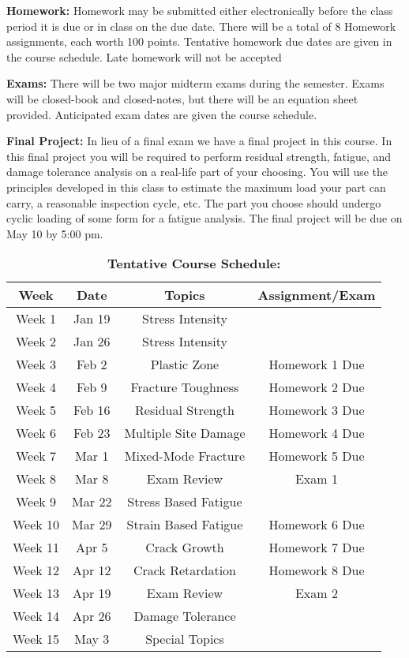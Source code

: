 \documentclass[11pt, a4paper]{article}
\begin{document}
\vspace*{.15in}
\noindent\textbf{Homework:} 
Homework may be submitted either electronically before the class period it is due or in class on the due date.
There will be a total of 8 Homework assignments, each worth 100 points.
Tentative homework due dates are given in the course schedule.
Late homework will not be accepted

\vspace*{.15in}
\noindent\textbf{Exams:} 
There will be two major midterm exams during the semester.
Exams will be closed-book and closed-notes, but there will be an equation sheet provided.
Anticipated exam dates are given the course schedule.

\vspace*{.15in}
\noindent\textbf{Final Project:} 
In lieu of a final exam we have a final project in this course.
In this final project you will be required to perform residual strength, fatigue, and damage tolerance analysis on a real-life part of your choosing.
You will use the principles developed in this class to estimate the maximum load your part can carry, a reasonable inspection cycle, etc.
The part you choose should undergo cyclic loading of some form for a fatigue analysis.
The final project will be due on May 10 by 5:00 pm.

\vspace*{.15in}
\begin{table}
	\captionsetup{singlelinecheck=false,justification=raggedright}
	\caption*{\noindent \textbf{Tentative Course Schedule:}}
	\centering
		\begin{tabular}{cccc}
			\hline
			Week & Date & Topics & Assignment/Exam \\
			\hline
			Week 1 & Jan 19 & Stress Intensity &  \\
			Week 2 & Jan 26 & Stress Intensity & \\
			Week 3 & Feb 2 & Plastic Zone & Homework 1 Due\\
			Week 4 & Feb 9 & Fracture Toughness & Homework 2 Due\\
			Week 5 & Feb 16 & Residual Strength & Homework 3 Due\\
			Week 6 & Feb 23 & Multiple Site Damage & Homework 4 Due\\
			Week 7 & Mar 1 & Mixed-Mode Fracture & Homework 5 Due\\
			Week 8 & Mar 8 & Exam Review & Exam 1 \\
			Week 9 & Mar 22 & Stress Based Fatigue & \\
			Week 10 & Mar 29 & Strain Based Fatigue & Homework 6 Due\\
			Week 11 & Apr 5 & Crack Growth & Homework 7 Due\\
			Week 12 & Apr 12 & Crack Retardation & Homework 8 Due\\
			Week 13 & Apr 19 & Exam Review & Exam 2\\
			Week 14 & Apr 26 & Damage Tolerance & \\
			Week 15 & May 3 & Special Topics & \\
			\hline
		\end{tabular}
\end{table}
\end{document}
